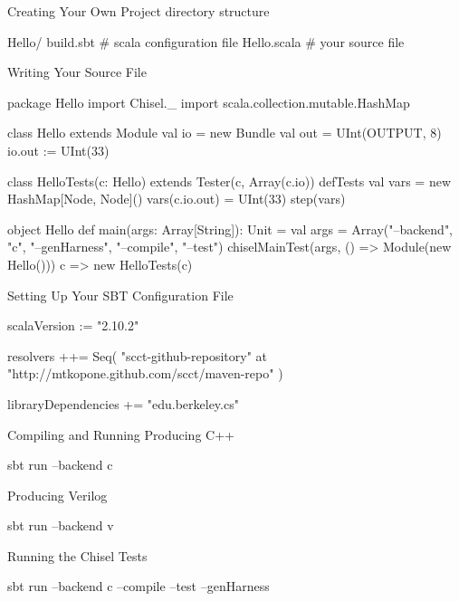 \documentclass[xcolor=pdflatex,dvipsnames,table]{beamer}
\begin{document}
\begin{frame}[fragile]{Creating Your Own Project}
directory structure
\begin{bash}
Hello/
  build.sbt   # scala configuration file
  Hello.scala # your source file
\end{bash}

\end{frame}

\begin{frame}[fragile]{Writing Your Source File}

{
\begin{scala}
package Hello
import Chisel._
import scala.collection.mutable.HashMap

class Hello extends Module {
  val io = new Bundle { 
    val out = UInt(OUTPUT, 8) }
  io.out := UInt(33)
}

class HelloTests(c: Hello) extends Tester(c, Array(c.io)) {
  defTests {
    val vars = new HashMap[Node, Node]()
    vars(c.io.out) = UInt(33)
    step(vars)
  }
}

object Hello {
  def main(args: Array[String]): Unit = {
    val args = Array("--backend", "c", "--genHarness", "--compile", "--test")
    chiselMainTest(args, () => Module(new Hello())) {
      c => new HelloTests(c) }
} }
\end{scala}
}

\end{frame}

\begin{frame}[fragile]{Setting Up Your SBT Configuration File}
\begin{scala}
scalaVersion := "2.10.2"

resolvers ++= Seq(
  "scct-github-repository" at "http://mtkopone.github.com/scct/maven-repo"
)

libraryDependencies += 
  "edu.berkeley.cs" %
\end{scala}
\end{frame}

\begin{frame}[fragile]{Compiling and Running}
Producing C++
\begin{bash}
sbt run --backend c
\end{bash}

Producing Verilog
\begin{bash}
sbt run --backend v
\end{bash}

Running the Chisel Tests
\begin{bash}
sbt run --backend c --compile --test --genHarness
\end{bash}

\end{frame}
\end{document}

